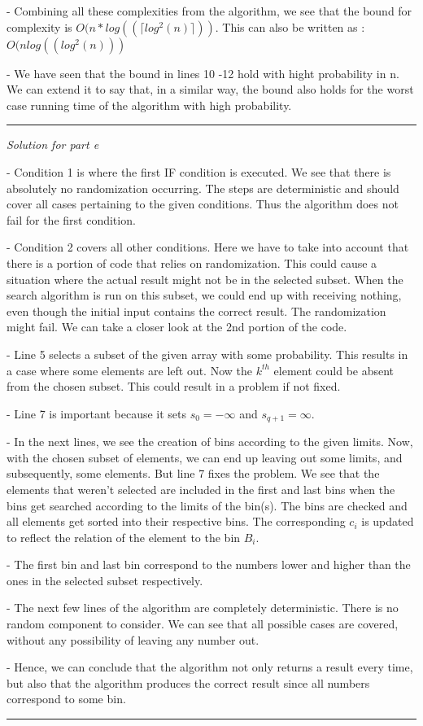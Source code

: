 \documentclass[11pt]{article}
\begin{document}
- Combining all these complexities from the algorithm, we see that the bound for complexity is $O(n* log((\lceil log^2 (n)\rceil))$. This can also be written as :$O(n log((log^2 (n)))$

- We have seen that the bound in lines 10 -12 hold with hight probability in n. We can extend it to say that, in a similar way, the bound also holds for the worst case running time of the algorithm with high probability. 

\medskip

\noindent\rule{8cm}{0.4pt}

\medskip

\textit{Solution for part e}

\medskip

- Condition 1 is where the first IF condition is executed. We see that there is absolutely no randomization occurring. The steps are deterministic and should cover all cases pertaining to the given conditions. Thus the algorithm does not fail for the first condition.

- Condition 2 covers all other conditions. Here we have to take into account that there is a portion of code that relies on randomization. This could cause a situation where the actual result might not be in the selected subset. When the search algorithm is run on this subset, we could end up with receiving nothing, even though the initial input contains the correct result. The randomization might fail. We can take a closer look at the 2nd portion of the code. 

- Line 5 selects a subset of the given array with some probability. This results in a case where some elements are left out. Now the $k^{th}$ element could be absent from the chosen subset. This could result in a problem if not fixed. 

- Line 7 is important because it sets $s_0 = -\infty$ and $s_{q+1}= \infty$. 

- In the next lines, we see the creation of bins according to the given limits. Now, with the chosen subset of elements, we can end up leaving out some limits, and subsequently, some elements. But line 7 fixes the problem. 
We see that the elements that weren't selected are included in the first and last bins when the bins get searched according to the limits of the bin(s). The bins are checked and all elements get sorted into their respective bins. The corresponding $c_i$ is updated to reflect the relation of the element to the bin $B_i$.

- The first bin and last bin correspond to the numbers lower and higher than the ones in the selected subset respectively.

- The next few lines of the algorithm are completely deterministic. There is no random component to consider. We can see that all possible cases are covered, without any possibility of leaving any number out.

- Hence, we can conclude that the algorithm not only returns a result every time, but also that the algorithm produces the correct result since all numbers correspond to some bin. 

\medskip

\noindent\rule{8cm}{0.4pt}

\medskip
\end{document}
